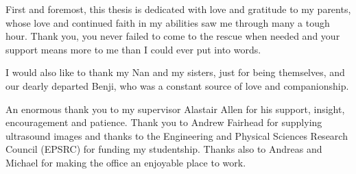 \documentclass[12pt]{report}
\renewcommand{\baselinestretch}{1.5}
\begin{document}
First and foremost, this thesis is dedicated with love and gratitude to 
my parents, whose love and continued faith in my abilities saw me through many a tough hour. 
Thank you, you never failed to come to the rescue when needed and your 
support means more to me than I could ever put into words.

I would also like to thank my Nan and my sisters, just for being themselves, 
and our dearly departed Benji, who was a constant source of love and companionship.

An enormous thank you to my supervisor Alastair Allen for his support, insight, 
encouragement and patience. 
Thank you to Andrew Fairhead for supplying ultrasound images and thanks to the
Engineering and Physical Sciences Research Council (EPSRC) for funding my studentship. 
Thanks also to Andreas and Michael for making the office an enjoyable place to work.

\newpage

\setlength{\topskip}{0cm}
\renewcommand{\baselinestretch}{1}
\begin{footnotesize}
\tableofcontents
\listoffigures
\listoftables
\end{footnotesize}
\renewcommand{\baselinestretch}{1.5}
\end{document}
